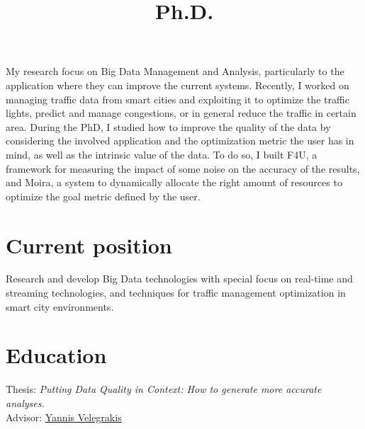 \documentclass[10pt,a4paper,colorlinks,linkcolor=true]{moderncv}
\title{Ph.D.}
\newcommand{\cvlink}[2]{\href{#1}{\ul{#2}}}
\begin{document}
\hypersetup{urlcolor=color1}

\makecvtitle
\pagestyle{empty} %
\setlength{\parskip}{0.4ex}

\vspace*{-5mm}

My research focus on Big Data Management and Analysis, particularly to the application where they can improve the current systems.
Recently, I worked on managing traffic data from smart cities and exploiting it to optimize the traffic lights, predict and manage congestions, or in general reduce the traffic in certain area.
During the PhD, I studied how to improve the quality of the data by considering the involved application and the optimization metric the user has in mind, as well as the intrinsic value of the data.
To do so, I built F4U, a framework for measuring the impact of some noise on the accuracy of the results, and Moira, a system to dynamically allocate the right amount of resources to optimize the goal metric defined by the user.


\section{Current position}

  {Research and develop Big Data technologies with special focus on real-time and streaming technologies, and techniques for traffic management optimization in smart city environments.}


\section{Education}

  {Thesis: \emph{Putting Data Quality in Context: How to generate more accurate analyses.}\\
  Advisor: \cvlink{https://scholar.google.it/citations?user=FI1rYesAAAAJ}{Yannis Velegrakis}}
\end{document}
